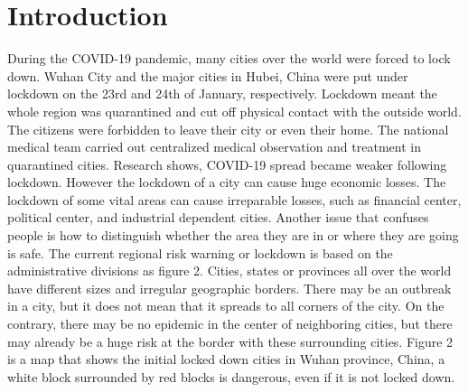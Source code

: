 \documentclass[sigplan,screen]{acmart}
\begin{document}
\maketitle
\section{Introduction}
During the COVID-19 pandemic, many cities over the world were forced to lock down.
Wuhan City and the major cities in Hubei, China were put under lockdown on the 23rd and 24th of January, respectively\cite{lau2020positive}.
Lockdown meant the whole region was quarantined and cut off physical contact with the outside world.
The citizens were forbidden to leave their city or even their home.
The national medical team carried out centralized medical observation and treatment in quarantined cities.
Research shows, COVID-19 spread became weaker following lockdown\cite{lau2020positive}.
However the lockdown of a city can cause huge economic losses.
The lockdown of some vital areas can cause irreparable losses, such as financial center, political center, and industrial dependent cities.
Another issue that confuses people is how to distinguish whether the area they are in or where they are going is safe.
The current regional risk warning or lockdown is based on the administrative divisions as figure 2.
Cities, states or provinces all over the world have different sizes and irregular geographic borders.
There may be an outbreak in a city, but it does not mean that it spreads to all corners of the city.
On the contrary, there may be no epidemic in the center of neighboring cities, but there may already be a huge risk at the border with these surrounding cities.
Figure 2 is a map that shows the initial locked down cities in Wuhan province, China, a white block surrounded by red blocks is dangerous, even if it is not locked down.
\end{document}
